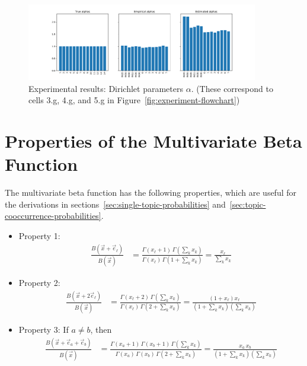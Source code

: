 \documentclass{article}
\theoremstyle{definition}
\begin{document}
\begin{figure}[hpbt]
    \centering
    \includegraphics[width=0.9\textwidth]{figures/True-vs-Empirical-vs-Estimated-alphas.pdf}
    \caption{Experimental results: Dirichlet parameters $\alpha$.  (These correspond to cells 3.g, 4.g, and 5.g in Figure~\ref{fig:experiment-flowchart})}
    \label{fig:True-vs-Empirical-vs-Estimated-alphas}
\end{figure}

\clearpage
\appendix
\section{Properties of the Multivariate Beta Function}

The multivariate beta function has the following properties, which are useful for the derivations in sections~\ref{sec:single-topic-probabilities} and~\ref{sec:topic-cooccurrence-probabilities}.

\begin{itemize}

\item Property 1:
\begin{align*}
\frac{B(\vec x + \vec e_\ell)}{B(\vec x)}
&= \frac{\Gamma(x_\ell + 1) \, \Gamma(\sum_k x_k)}
        {\Gamma(x_\ell) \, \Gamma(1 + \sum_k x_k)}
= \frac{x_\ell}{\sum_k x_k}
\end{align*}

\item Property 2:
\begin{align*}
\frac{B(\vec x + 2\vec e_\ell)}{B(\vec x)}
&= \frac{\Gamma(x_\ell + 2) \, \Gamma(\sum_k x_k)}
        {\Gamma(x_\ell) \, \Gamma(2 + \sum_k x_k)}
= \frac{(1 + x_\ell) x_\ell}{(1 + \sum_k x_k) (\sum_k x_k)}
\end{align*}

\item Property 3:
If $a \neq b$, then
\begin{align*}
\frac{B(\vec x + \vec e_a + \vec e_b)}{B(\vec x)}
&= \frac{\Gamma(x_a + 1) \, \Gamma(x_b + 1) \, \Gamma(\sum_k x_k)}
        {\Gamma(x_a) \, \Gamma(x_b) \, \Gamma(2 + \sum_k x_k)}
= \frac{x_a \, x_b}{(1 + \sum_k x_k) (\sum_k x_k)}
\end{align*}

\end{itemize}
\end{document}
